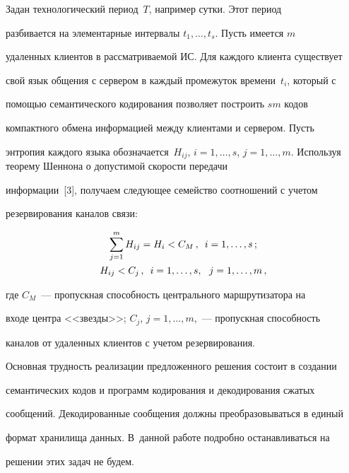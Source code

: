  Задан технологический период~$T$, например сутки. Этот период 


разбивается на элементарные интервалы $t_1, \ldots , t_s$. Пусть имеется $m$ 


удаленных клиентов в рассматриваемой ИС. Для каждого клиента существует 


свой язык общения с сервером в каждый промежуток времени~$t_i$, который с 


помощью семантического кодирования позволяет построить $s m$ кодов 


компактного обмена информацией между клиентами и сервером. Пусть 


энтропия каждого языка обозначается~$H_{ij}$, $i = 1, \ldots , s$, $j = 1, \ldots , 


m$. Используя теорему Шеннона о допустимой скорости передачи 


информации~[3], получаем следующее семейство соотношений с учетом 


резервирования каналов связи:





\noindent


  \begin{gather*}


  \sum\limits_{j=1}^m H_{ij} =H_i<C_M\,,\enskip i=1,\ldots , s\,;\\


  H_{ij}<C_j\,,\enskip i=1, \ldots , s,\ \ j=1, \ldots , m\,,


  \end{gather*}


    где $C_M$~--- пропускная способность центрального маршрутизатора на 


входе центра <<звезды>>; $C_j$, $j=1, \ldots ,m$,~--- пропускная способность 


каналов от удаленных клиентов с учетом резервирования. 


    


  Основная трудность реализации предложенного решения состоит в создании 


семантических кодов и программ кодирования и декодирования сжатых 


сообщений. Декодированные сообщения должны преобразовываться в единый 


формат хранилища данных. В~данной работе подробно останавливаться на 


решении этих задач не будем. 


